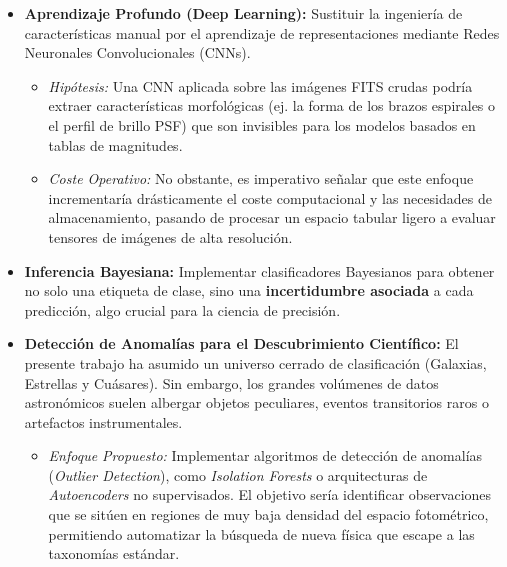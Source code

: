 \documentclass[12pt, a4paper]{report}
\begin{document}
\begin{itemize}
    \item \textbf{Aprendizaje Profundo (Deep Learning):} Sustituir la ingeniería de características manual por el aprendizaje de representaciones mediante Redes Neuronales Convolucionales (CNNs).
    \begin{itemize}
        \item \textit{Hipótesis:} Una CNN aplicada sobre las imágenes FITS crudas podría extraer características morfológicas (ej. la forma de los brazos espirales o el perfil de brillo PSF) que son invisibles para los modelos basados en tablas de magnitudes.
        \item \textit{Coste Operativo:} No obstante, es imperativo señalar que este enfoque incrementaría drásticamente el coste computacional y las necesidades de almacenamiento, pasando de procesar un espacio tabular ligero a evaluar tensores de imágenes de alta resolución.
    \end{itemize}

    \item \textbf{Inferencia Bayesiana:} Implementar clasificadores Bayesianos para obtener no solo una etiqueta de clase, sino una \textbf{incertidumbre asociada} a cada predicción, algo crucial para la ciencia de precisión.

    \item \textbf{Detección de Anomalías para el Descubrimiento Científico:} El presente trabajo ha asumido un universo cerrado de clasificación (Galaxias, Estrellas y Cuásares). Sin embargo, los grandes volúmenes de datos astronómicos suelen albergar objetos peculiares, eventos transitorios raros o artefactos instrumentales.
    \begin{itemize}
        \item \textit{Enfoque Propuesto:} Implementar algoritmos de detección de anomalías (\textit{Outlier Detection}), como \textit{Isolation Forests} o arquitecturas de \textit{Autoencoders} no supervisados. El objetivo sería identificar observaciones que se sitúen en regiones de muy baja densidad del espacio fotométrico, permitiendo automatizar la búsqueda de nueva física que escape a las taxonomías estándar.
    \end{itemize}
\end{itemize}

\clearpage


\end{document}
